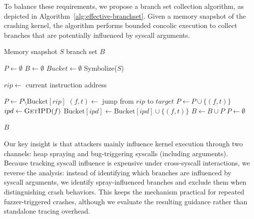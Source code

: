 To balance these requirements, we propose a branch set collection algorithm, as depicted in Algorithm~\ref{alg:effective-branchset}. Given a memory snapshot of the crashing kernel, the algorithm performs bounded concolic execution to collect branches that are potentially influenced by syscall arguments.



\begin{algorithm}[htbp]
\caption{Efficient Branch Set Collection}
\label{alg:effective-branchset}
\begin{algorithmic}[1]
\Require Memory snapshot $S$
\Ensure  branch set $B$

\State $P \gets \emptyset$ 
\State $B \gets \emptyset$ 
\State $Bucket \gets \emptyset$ 
\State Symbolize($S$) 

    \State $rip \gets$ current instruction address

     
        \State $P \gets P \setminus \text{Bucket}[rip]$
    \EndIf
        \State $(f, t) \gets$ jump from $rip$ to $target$
        \State $P \gets P \cup \{(f, t)\}$
        \State $ipd \gets \textsc{GetIPD}(f)$
        \State $\text{Bucket}[ipd] \gets \text{Bucket}[ipd] \cup \{(f, t)\}$
        \State $B \gets B \cup P$
        \State $P \gets \emptyset$
    \EndIf
\EndWhile

\State \Return $B$
\end{algorithmic}
\end{algorithm}

Our key insight is that attackers mainly influence kernel execution through two channels: heap spraying and bug-triggering syscalls (including arguments). Because tracking syscall influence is expensive under cross-syscall interactions, we reverse the analysis: instead of identifying which branches are influenced by syscall arguments, we identify spray-influenced branches and exclude them when distinguishing crash behaviors. This keeps the mechanism practical for repeated fuzzer-triggered crashes, although we evaluate the resulting guidance rather than standalone tracing overhead.

